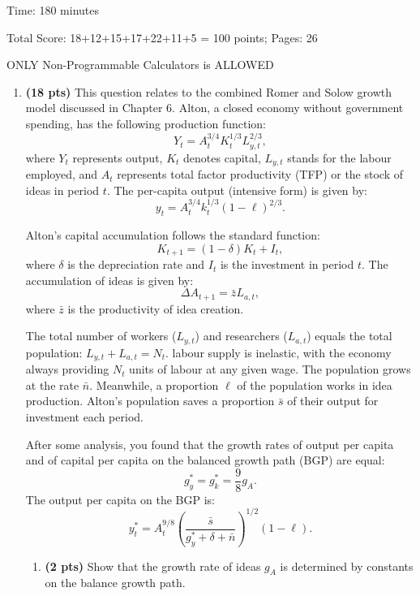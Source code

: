 \documentclass[14pt, oneside]{memoir}
\begin{document}
{{{\begin{center}
{{{{				Time: 180 minutes
				
				Total Score: 18+12+15+17+22+11+5 = 100 points; Pages: 26
				
				ONLY Non-Programmable Calculators is ALLOWED
	}}}}
	\mbox{}
	\vfill

\end{center}

\quad
\newpage

\begin{enumerate}[label=\textbf{\arabic*.}, itemsep=15pt]

\item \textbf{(18 pts)}\label{P6} This question relates to the combined Romer and Solow growth model discussed in Chapter 6. Alton, a closed economy without government spending, has the following production function:
\[
Y_t = A_t^{3/4} K_t^{1/3} L_{y,t}^{2/3},
\]
where \(Y_t\) represents output, \(K_t\) denotes capital, \(L_{y,t}\) stands for the labour employed, and \(A_t\) represents total factor productivity (TFP) or the stock of ideas in period \(t\). The per-capita output (intensive form) is given by:
\[
y_t = A_t^{3/4} k_t^{1/3} (1-\ell)^{2/3}.
\]

Alton's capital accumulation follows the standard function:
\[
K_{t+1} = (1 - \delta) K_t + I_t,
\]
where \(\delta\) is the depreciation rate and \(I_t\) is the investment in period \(t\). The accumulation of ideas is given by:
\[
\Delta A_{t+1} = \bar{z}L_{a,t},
\]
where \(\bar{z}\) is the productivity of idea creation.

The total number of workers (\(L_{y,t}\)) and researchers (\(L_{a,t}\)) equals the total population: $
L_{y,t} + L_{a,t} = N_t$. 
labour supply is inelastic, with the economy always providing \(N_t\) units of labour at any given wage. The population grows at the rate \(\bar{n}\). Meanwhile, a proportion \(\ell\) of the population works in idea production. Alton's population saves a proportion \(\bar{s}\) of their output for investment each period.

After some analysis, you found that the growth rates of output per capita and of capital per capita on the balanced growth path (BGP) are equal:
\[
g_{y}^* = g_k^* = \frac{9}{8} g_A.
\]
The output per capita on the BGP is:
\[
y_t^{*} = A_t^{9/8} \left(\frac{\bar{s}}{g_y^* + \delta + \bar{n}}\right)^{1/2} (1-\ell).
\]


\clearpage
\begin{enumerate}[label=(\alph*)]
	\item \textbf{(2 pts)} Show that the growth rate of ideas $g_A$ is determined by constants on the balance growth path.
	

\end{enumerate}
\end{enumerate}}}}
\end{document}
